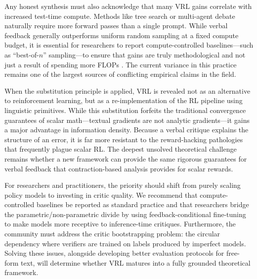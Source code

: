 Any honest synthesis must also acknowledge that many VRL gains correlate with increased test-time compute. Methods like tree search or multi-agent debate naturally require more forward passes than a single prompt. While verbal feedback generally outperforms uniform random sampling at a fixed compute budget, it is essential for researchers to report compute-controlled baselines—such as ``best-of-$n$'' sampling—to ensure that gains are truly methodological and not just a result of spending more FLOPs \citep{snell2024scaling}. The current variance in this practice remains one of the largest sources of conflicting empirical claims in the field.

When the substitution principle is applied, VRL is revealed not as an alternative to reinforcement learning, but as a re-implementation of the RL pipeline using linguistic primitives. While this substitution forfeits the traditional convergence guarantees of scalar math—textual gradients are not analytic gradients—it gains a major advantage in information density. Because a verbal critique explains the structure of an error, it is far more resistant to the reward-hacking pathologies that frequently plague scalar RL. The deepest unsolved theoretical challenge remains whether a new framework can provide the same rigorous guarantees for verbal feedback that contraction-based analysis provides for scalar rewards.

For researchers and practitioners, the priority should shift from purely scaling policy models to investing in critic quality. We recommend that compute-controlled baselines be reported as standard practice and that researchers bridge the parametric/non-parametric divide by using feedback-conditional fine-tuning to make models more receptive to inference-time critiques. Furthermore, the community must address the critic bootstrapping problem: the circular dependency where verifiers are trained on labels produced by imperfect models. Solving these issues, alongside developing better evaluation protocols for free-form text, will determine whether VRL matures into a fully grounded theoretical framework.











